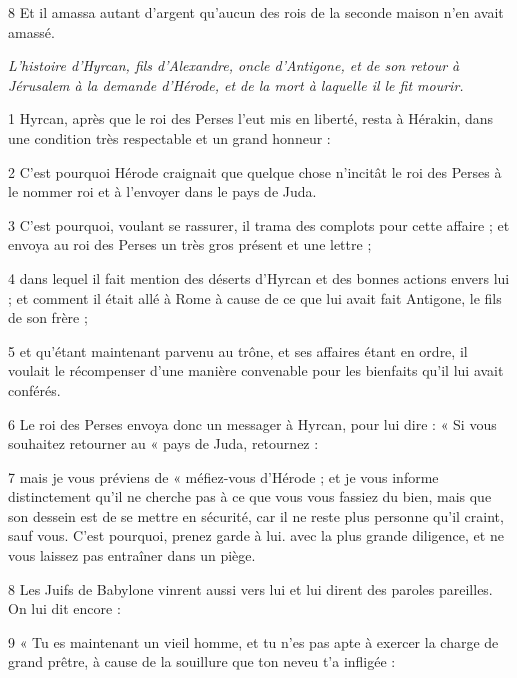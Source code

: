 \par 8 Et il amassa autant d'argent qu'aucun des rois de la seconde maison n'en avait amassé.


\par \textit{L'histoire d'Hyrcan, fils d'Alexandre, oncle d'Antigone, et de son retour à Jérusalem à la demande d'Hérode, et de la mort à laquelle il le fit mourir.}

\par 1 Hyrcan, après que le roi des Perses l'eut mis en liberté, resta à Hérakin, dans une condition très respectable et un grand honneur :

\par 2 C'est pourquoi Hérode craignait que quelque chose n'incitât le roi des Perses à le nommer roi et à l'envoyer dans le pays de Juda.

\par 3 C'est pourquoi, voulant se rassurer, il trama des complots pour cette affaire ; et envoya au roi des Perses un très gros présent et une lettre ;

\par 4 dans lequel il fait mention des déserts d'Hyrcan et des bonnes actions envers lui ; et comment il était allé à Rome à cause de ce que lui avait fait Antigone, le fils de son frère ;

\par 5 et qu'étant maintenant parvenu au trône, et ses affaires étant en ordre, il voulait le récompenser d'une manière convenable pour les bienfaits qu'il lui avait conférés.

\par 6 Le roi des Perses envoya donc un messager à Hyrcan, pour lui dire : « Si vous souhaitez retourner au « pays de Juda, retournez :

\par 7 mais je vous préviens de « méfiez-vous d'Hérode ; et je vous informe distinctement qu'il ne cherche pas à ce que vous vous fassiez du bien, mais que son dessein est de se mettre en sécurité, car il ne reste plus personne qu'il craint, sauf vous. C'est pourquoi, prenez garde à lui. avec la plus grande diligence, et ne vous laissez pas entraîner dans un piège.

\par 8 Les Juifs de Babylone vinrent aussi vers lui et lui dirent des paroles pareilles. On lui dit encore :

\par 9 « Tu es maintenant un vieil homme, et tu n'es pas apte à exercer la charge de grand prêtre, à cause de la souillure que ton neveu t'a infligée :

